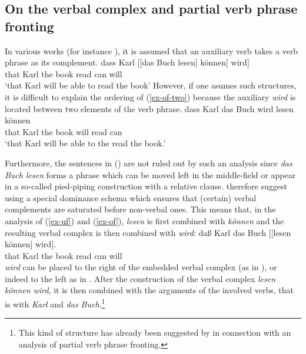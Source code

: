 {{\subsection{On the verbal complex and partial verb phrase fronting}
\label{sec-pred-compl}

In various works (for instance \citealp{Uszkoreit87a}), it is assumed that an
auxiliary verb takes a verb phrase as its complement.
\ea
\label{ex-uf-two}
\gll dass Karl [[das Buch lesen] können] wird]\\
	 that Karl the book read can will\\
\glt `that Karl will be able to read the book'
\z
However, if one asumes such structures, it is difficult to explain the ordering of (\ref{ex-of-two}) because the auxiliary \emph{wird} is located between two elements
of the verb phrase.
\ea
\label{ex-of-two}
\gll dass Karl das Buch wird lesen können\\
     that Karl the book will read can\\
\glt `that Karl will be able to the read the book.'
\z

Furthermore, the sentences in () are not ruled out by such an analysis since \emph{das Buch lesen} 
forms a phrase which can be moved left in the middle-field or appear in a so-called pied-piping construction 
with a relative clause.
\eal
{}
\zl
%
\citet*{HN94a} therefore suggest using a special dominance schema which ensures that
(certain) verbal complements are saturated before non-verbal ones. This means that, in the analysis of (\ref{ex-uf}) and (\ref{ex-of}),
\emph{lesen} is first combined with \emph{können} and the resulting verbal complex is then combined with \emph{wird}:
\ea
\gll daß Karl das Buch [[lesen können] wird].\\
     that Karl the book \hspaceThis{[[}read can will\\
\z
\emph{wird} can be placed to the right of the embedded verbal complex (as in ), or indeed to the left as
in . After the construction of the verbal complex \emph{lesen können wird}, it is then combined with the 
arguments of the involved verbs, that is with \emph{Karl} and \emph{das Buch}.\footnote{
		This kind of structure has already been suggested 
		by \citet*{Johnson86a} in connection with an analysis of partial verb phrase fronting.
}

}}
